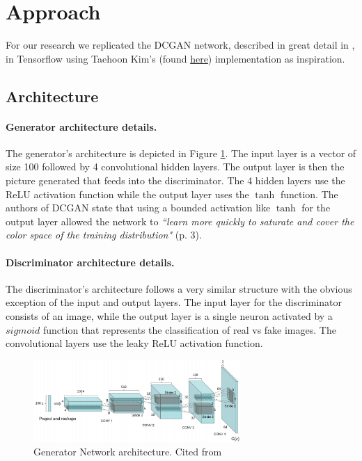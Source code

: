 
\section{Approach}
%
For our research we replicated the DCGAN network, described in great detail in \cite{DBLP:journals/corr/RadfordMC15}, in Tensorflow using Taehoon Kim's (found \href{https://github.com/carpedm20/DCGAN-tensorflow}{here}) implementation as inspiration.

\subsection{Architecture}

\paragraph{Generator architecture details.} The generator's architecture is depicted in Figure \ref{fig:architecture}. The input layer is a vector of size 100 followed by 4 convolutional hidden layers. The output layer is then the picture generated that feeds into the discriminator. The 4 hidden layers use the ReLU activation function while the output layer uses the $\tanh$ function. The authors of DCGAN state that using a bounded activation like $\tanh$ for the output layer allowed the network to \textit{``learn more quickly to saturate and cover the color space of the training distribution"} \cite{DBLP:journals/corr/RadfordMC15} (p. 3).
\paragraph{Discriminator architecture details.} The discriminator's architecture follows a very similar structure with the obvious exception of the input and output layers. The input layer for the discriminator consists of an image, while the output layer is a single neuron activated by a $sigmoid$ function that represents the classification of real vs fake images. The convolutional layers use the leaky ReLU activation function.\begin{figure}[h]
\centering
\includegraphics[width=0.7\textwidth]{figures/DCGAN.png}
\caption{Generator Network architecture. Cited from \cite{DBLP:journals/corr/RadfordMC15} }
\label{fig:architecture}
\end{figure}

